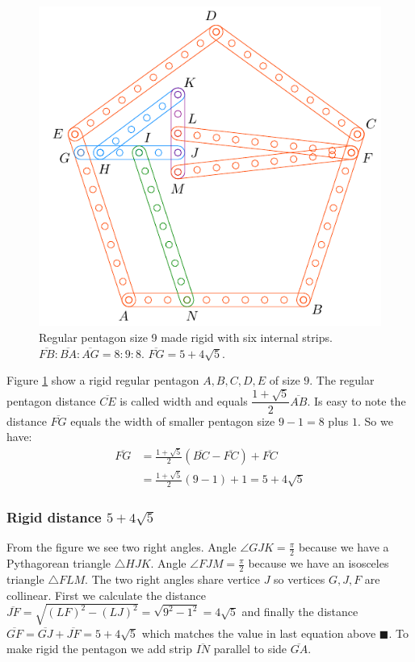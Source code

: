 \documentclass[11pt]{article}
\begin{document}
\begin{figure}[h]
 \centering
 \includegraphics[scale=0.95]{9/penta9a}
 \caption{Regular pentagon size 9 made rigid with six internal strips. $\overline{FB}:\overline{BA}:\overline{AG} = 8:9:8$. $\overline{FG}=5+4\sqrt5$. }
 \label{fig:penta9a}
\end{figure}

Figure \ref{fig:penta9a} show a rigid regular pentagon $A,B,C,D,E$ of size $9$. The regular pentagon distance $\overline{CE}$ is called width and equals $\dfrac{1+\sqrt5}{2}\overline{AB}$. Is easy to note the distance $\overline{FG}$ equals the width of smaller pentagon size $9-1=8$ plus $1$. So we have:
\begin{align}
\overline{FG} &= \frac{1+\sqrt5}{2}(\overline{BC}-\overline{FC}) + \overline{FC}\nonumber\\
 &= \frac{1+\sqrt5}{2}(9-1) + 1 = 5 + 4\sqrt5
\end{align}

\subsubsection{Rigid distance $5 + 4\sqrt5$}

From the figure we see two right angles. Angle $\angle{GJK}=\frac{\pi}2$ because we have a Pythagorean triangle $\triangle{HJK}$. Angle $\angle{FJM}=\frac{\pi}2$ because we have an isosceles triangle $\triangle{FLM}$. The two right angles share vertice $J$ so vertices $G,J,F$ are collinear. First we calculate the distance $\overline{JF} = \sqrt{(LF)^2 - (LJ)^2} = \sqrt{9^2-1^2} = 4\sqrt5$ and finally the distance $\overline{GF} = \overline{GJ} + \overline{JF} = 5 + 4\sqrt5$ which matches the value in last equation above $\blacksquare$. To make rigid the pentagon we add strip $\overline{IN}$ parallel to side $\overline{GA}$.
\end{document}
